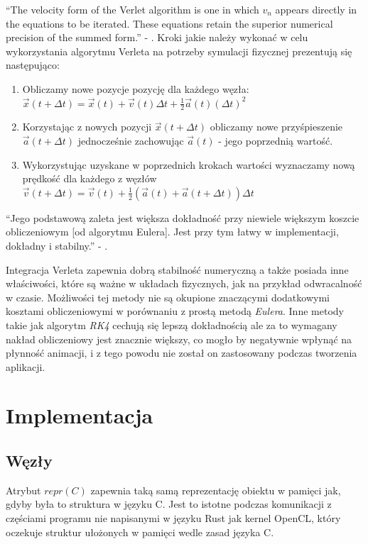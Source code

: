 \documentclass[12pt, letterpaper]{report}
\begin{document}
    ``The velocity form of the Verlet algorithm is one in
        which $v_{n}$ appears directly in the equations to be iterated.
        These equations retain the superior numerical precision
        of the summed form.'' - \cite{velocityverlet}.
    Kroki jakie należy wykonać w celu wykorzystania algorytmu Verleta na 
    potrzeby symulacji fizycznej prezentują się następująco:
    \begin{enumerate}
        \item Obliczamy nowe pozycje pozycję dla każdego węzła: 
        $\vec{x}(t + \Delta t) = \vec{x}(t) + \vec{v}(t) \Delta t + \frac{1}{2} \vec{a}(t) (\Delta t)^2$

        \item Korzystając z nowych pozycji $\vec{x}(t + \Delta t)$ obliczamy nowe 
        przyśpieszenie $\vec{a}(t + \Delta t)$ jednocześnie 
        zachowując $\vec{a}(t)$ - jego poprzednią wartość.

        \item Wykorzystując uzyskane w poprzednich krokach wartości wyznaczamy nową prędkość dla każdego z węzłów 
        $\vec{v}(t + \Delta t) = \vec{v}(t) + \frac{1}{2} \left( \vec{a}(t) + \vec{a}(t + \Delta t) \right) \Delta t$
    \end{enumerate}

    ``Jego podstawową zaleta jest większa dokładność przy niewiele większym koszcie obliczeniowym 
    [od algorytmu Eulera]. 
    Jest przy tym łatwy w implementacji, dokładny i stabilny.'' - \cite{numerical}.

    Integracja Verleta zapewnia dobrą stabilność numeryczną a także posiada inne właściwości, które 
    są ważne w układach fizycznych, jak na przykład odwracalność w czasie. Możliwości tej metody nie są 
    okupione znaczącymi dodatkowymi kosztami obliczeniowymi w porównaniu z prostą metodą \emph{Eulera}. 
    Inne metody takie jak algorytm \emph{RK4} cechują się lepszą dokładnością ale za 
    to wymagany nakład obliczeniowy jest znacznie większy, co mogło by negatywnie wpłynąć na płynność animacji,
    i z tego powodu nie został on zastosowany podczas tworzenia aplikacji.

\chapter{Implementacja}
    \section{Węzły}
    
    Atrybut $repr(C)$ zapewnia taką samą reprezentację obiektu w pamięci jak, gdyby była to
    struktura w języku C. Jest to istotne podczas komunikacji z częściami programu nie napisanymi
    w języku Rust jak kernel OpenCL, który oczekuje struktur ułożonych w pamięci wedle zasad 
    języka C.
\end{document}
